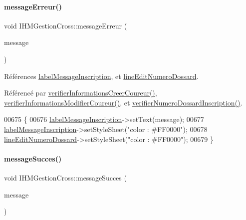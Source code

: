 \paragraph{\texorpdfstring{message\+Erreur()}{messageErreur()}}
{\footnotesize\ttfamily void I\+H\+M\+Gestion\+Cross\+::message\+Erreur (\begin{DoxyParamCaption}\item[{Q\+String}]{message }\end{DoxyParamCaption})\hspace{0.3cm}{\ttfamily [private]}}



Références \hyperlink{class_i_h_m_gestion_cross_a1855bd63290c39c20660064b41710e8c}{label\+Message\+Inscription}, et \hyperlink{class_i_h_m_gestion_cross_adeb4cfc9a218c06fca5cabc280a611e2}{line\+Edit\+Numero\+Dossard}.



Référencé par \hyperlink{class_i_h_m_gestion_cross_ae08eec25f5a6d33bf133b0cee78c7c5c}{verifier\+Informations\+Creer\+Coureur()}, \hyperlink{class_i_h_m_gestion_cross_a0e088653019d8adefb371348f272d2e2}{verifier\+Informations\+Modifier\+Coureur()}, et \hyperlink{class_i_h_m_gestion_cross_a164be2d046cf18ee03e3939d03a5580d}{verifier\+Numero\+Dossard\+Inscription()}.


\begin{DoxyCode}
00675 \{
00676     \hyperlink{class_i_h_m_gestion_cross_a1855bd63290c39c20660064b41710e8c}{labelMessageInscription}->setText(message);
00677     \hyperlink{class_i_h_m_gestion_cross_a1855bd63290c39c20660064b41710e8c}{labelMessageInscription}->setStyleSheet(\textcolor{stringliteral}{"color : #FF0000"});
00678     \hyperlink{class_i_h_m_gestion_cross_adeb4cfc9a218c06fca5cabc280a611e2}{lineEditNumeroDossard}->setStyleSheet(\textcolor{stringliteral}{"color : #FF0000"});
00679 \}
\end{DoxyCode}
\mbox{\label{class_i_h_m_gestion_cross_a71412d0c3e1d059a646c755803077a7b}} 
\paragraph{\texorpdfstring{message\+Succes()}{messageSucces()}}
{\footnotesize\ttfamily void I\+H\+M\+Gestion\+Cross\+::message\+Succes (\begin{DoxyParamCaption}\item[{Q\+String}]{message }\end{DoxyParamCaption})\hspace{0.3cm}{\ttfamily [private]}}



